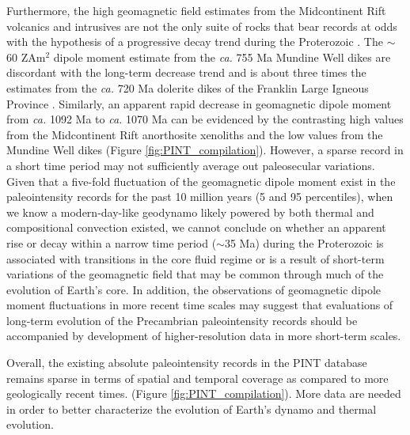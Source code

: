 \documentclass[9pt,twocolumn,twoside,lineno]{pnas-new}
\begin{document}
Furthermore, the high geomagnetic field estimates from the Midcontinent Rift volcanics and intrusives are not the only suite of rocks that bear records at odds with the hypothesis of a progressive decay trend during the Proterozoic \cite{Biggin2009a, Bono2019a}. The $\sim$60 ZAm$^2$ dipole moment estimate from the \textit{ca.} 755 Ma Mundine Well dikes are discordant with the long-term decrease trend \cite{Bono2019a} and is about three times the estimates from the \textit{ca.} 720 Ma dolerite dikes of the Franklin Large Igneous Province \cite{Lloyd2021a}. Similarly, an apparent rapid decrease in geomagnetic dipole moment from \textit{ca.} 1092 Ma to \textit{ca.} 1070 Ma can be evidenced by the contrasting high values from the Midcontinent Rift anorthosite xenoliths and the low values from the Mundine Well dikes (Figure \ref{fig:PINT_compilation}). However, a sparse record in a short time period may not sufficiently average out paleosecular variations. Given that a five-fold fluctuation of the geomagnetic dipole moment exist in the paleointensity records for the past 10 million years (5 and 95 percentiles), when we know a modern-day-like geodynamo likely powered by both thermal and compositional convection existed, we cannot conclude on whether an apparent rise or decay within a narrow time period ($\sim$35 Ma) during the Proterozoic is associated with transitions in the core fluid regime or is a result of short-term variations of the geomagnetic field that may be common through much of the evolution of Earth's core. In addition, the observations of geomagnetic dipole moment fluctuations in more recent time scales may suggest that evaluations of long-term evolution of the Precambrian paleointensity records should be accompanied by development of higher-resolution data in more short-term scales. 

Overall, the existing absolute paleointensity records in the PINT database remains sparse in terms of spatial and temporal coverage as compared to more geologically recent times. (Figure \ref{fig:PINT_compilation}). More data are needed in order to better characterize the evolution of Earth's dynamo and thermal evolution. 
\end{document}
